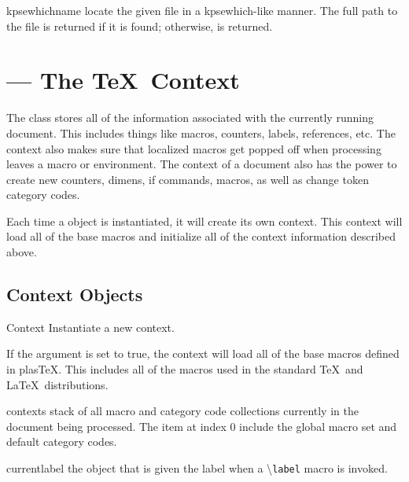 \documentclass{manual}
\newcommand{\macro}[1]{\textbackslash\texttt{#1}}
\newcommand{\plasTeX}{plas\TeX}
\begin{document}
\begin{methoddesc}[TeX]{kpsewhich}{name}
locate the given file in a kpsewhich-like manner.  The full path to the
file is returned if it is found; otherwise,  is returned.
\end{methoddesc}


\section{ --- The \TeX\ Context}


The  class stores all of the information associated with
the currently running document.  This includes things like macros, counters, 
labels, references, etc.  The context also makes sure that localized macros
get popped off when processing leaves a macro or environment.  The context
of a document also has the power to create new counters, dimens, if commands,
macros, as well as change token category codes.

Each time a  object is instantiated, it will create its own 
context.  This context will load all of the base macros and initialize
all of the context information described above.


\subsection{Context Objects}

\begin{classdesc}{Context}{}
Instantiate a new context.

If the  argument is set to true, the context will load all of the
base macros defined in \plasTeX.  This includes all of the macros used in 
the standard \TeX\ and \LaTeX\ distributions.
\end{classdesc}

\begin{memberdesc}[Context]{contexts}
stack of all macro and category code collections currently in the document 
being processed.  The item at index 0 include the global macro set and 
default category codes.
\end{memberdesc}

\begin{memberdesc}[Context]{currentlabel}
the object that is given the label when a \macro{label} macro is invoked.
\end{memberdesc}
\end{document}
